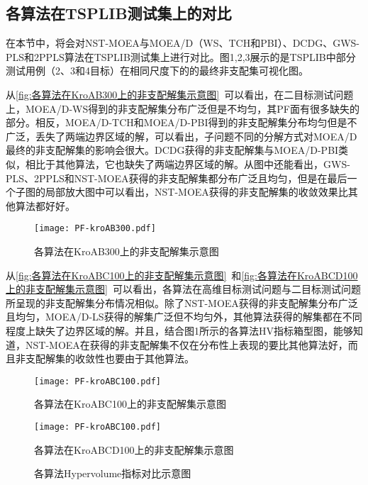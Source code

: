 \subsection{各算法在TSPLIB测试集上的对比}
\label{subsec:NST:实验与讨论:各算法在TSPLIB测试集上的对比}
在本节中，将会对NST-MOEA与MOEA/D（WS、TCH和PBI）、DCDG、GWS-PLS和2PPLS算法在TSPLIB测试集上进行对比。图1,2,3展示的是TSPLIB中部分测试用例（2、3和4目标）在相同尺度下的的最终非支配集可视化图。
\par
从\autoref{fig:各算法在KroAB300上的非支配解集示意图}~可以看出，在二目标测试问题上，MOEA/D-WS得到的非支配解集分布广泛但是不均匀，其PF面有很多缺失的部分。相反，MOEA/D-TCH和MOEA/D-PBI得到的非支配解集分布均匀但是不广泛，丢失了两端边界区域的解，可以看出，子问题不同的分解方式对MOEA/D最终的非支配解集的影响会很大。DCDG获得的非支配解集与MOEA/D-PBI类似，相比于其他算法，它也缺失了两端边界区域的解。从图中还能看出，GWS-PLS、2PPLS和NST-MOEA获得的非支配解集都分布广泛且均匀，但是在最后一个子图的局部放大图中可以看出，NST-MOEA获得的非支配解集的收敛效果比其他算法都好好。
\begin{figure}[h]
    \texttt{[image: PF-kroAB300.pdf]}
    \caption[各算法在KroAB300上的非支配解集示意图]{各算法在KroAB300上的非支配解集示意图}
    \label{fig:各算法在KroAB300上的非支配解集示意图}
\end{figure}
\par
从\autoref{fig:各算法在KroABC100上的非支配解集示意图}~和\autoref{fig:各算法在KroABCD100上的非支配解集示意图}~可以看出，各算法在高维目标测试问题与二目标测试问题所呈现的非支配解集分布情况相似。除了NST-MOEA获得的非支配解集分布广泛且均匀，MOEA/D-LS获得的解集广泛但不均匀外，其他算法获得的解集都在不同程度上缺失了边界区域的解。并且，结合图1所示的各算法HV指标箱型图，能够知道，NST-MOEA在获得的非支配解集不仅在分布性上表现的要比其他算法好，而且非支配解集的收敛性也要由于其他算法。
\begin{figure}[!h]
    \texttt{[image: PF-kroABC100.pdf]}
    \caption[各算法在KroABC100上的非支配解集示意图]{各算法在KroABC100上的非支配解集示意图}
    \label{fig:各算法在KroABC100上的非支配解集示意图}
\end{figure}
\begin{figure}[!h]
    \texttt{[image: PF-kroABC100.pdf]}
    \caption[各算法在KroABCD100上的非支配解集示意图]{各算法在KroABCD100上的非支配解集示意图}
    \label{fig:各算法在KroABCD100上的非支配解集示意图}
\end{figure}
\begin{figure}[!h]
    \caption[各算法Hypervolume指标对比示意图]{各算法Hypervolume指标对比示意图}
    \label{fig:各算法Hypervolume指标对比示意图}
\end{figure}
